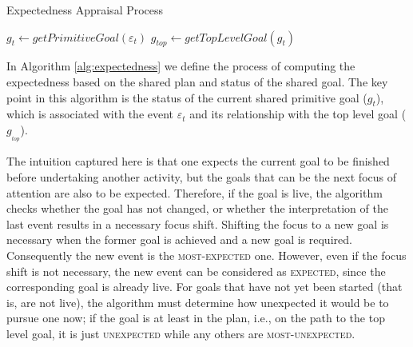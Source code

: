 \documentclass[12pt]{report}
\begin{document}
\begin{algorithm}[t]
	\caption{Expectedness Appraisal Process}
	\label{alg:expectedness}
	\begin{algorithmic}[1]
			\Statex
			\State $\mathit{g}_{t} \gets \textit{getPrimitiveGoal}{(\varepsilon_t)}$
			\State $\mathit{g}_{top} \gets \textit{getTopLevelGoal}{(\mathit{g}_{t})}$
			\Statex
				\State {}
				\Else
					\State {}
				\EndIf
			\Else
					\State {}
				\Else
					\State {}
				\EndIf
			\EndIf
		\EndFunction
	\end{algorithmic}
\end{algorithm}

In Algorithm \ref{alg:expectedness} we define the process of computing the
expectedness based on the shared plan and status of the shared goal. The key
point in this algorithm is the status of the current shared primitive goal
($\mathit{g}_{t}$), which is associated with the event $\varepsilon_t$ and its
relationship with the top level goal ($\mathit{g}_{_{top}}$).

The intuition captured here is that one expects the current goal to be finished
before undertaking another activity, but the goals that can be the next focus of
attention are also to be expected. Therefore, if the goal is live, the algorithm
checks whether the goal has not changed, or whether the interpretation of the
last event results in a necessary focus shift. Shifting the focus to a new goal
is necessary when the former goal is achieved and a new goal is required.
Consequently the new event is the \textsc{most-expected} one. However, even if
the focus shift is not necessary, the new event can be considered as
\textsc{expected}, since the corresponding goal is already live. For goals that
have not yet been started (that is, are not live), the algorithm must determine
how unexpected it would be to pursue one now; if the goal is at least in the
plan, i.e., on the path to the top level goal, it is just \textsc{unexpected}
while any others are \textsc{most-unexpected}.
\end{document}

